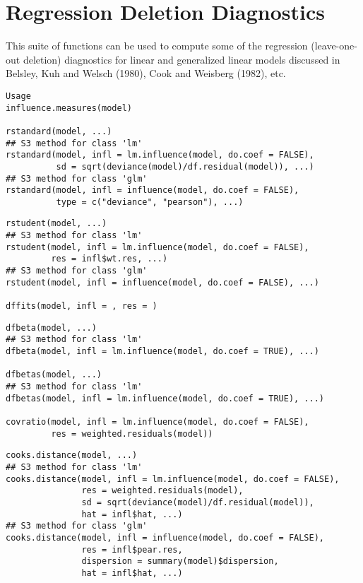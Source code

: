 \documentclass[residuals.tex]{subfiles}
\begin{document}
	
\section{Regression Deletion Diagnostics}

This suite of functions can be used to compute some of the regression (leave-one-out deletion) diagnostics for linear and generalized linear models discussed in Belsley, Kuh and Welsch (1980), Cook and Weisberg (1982), etc. 

\begin{framed}
\begin{verbatim}
Usage
influence.measures(model)

rstandard(model, ...)
## S3 method for class 'lm'
rstandard(model, infl = lm.influence(model, do.coef = FALSE),
          sd = sqrt(deviance(model)/df.residual(model)), ...)
## S3 method for class 'glm'
rstandard(model, infl = influence(model, do.coef = FALSE),
          type = c("deviance", "pearson"), ...)
\end{verbatim}
\end{framed}

\begin{framed}
	\begin{verbatim}
rstudent(model, ...)
## S3 method for class 'lm'
rstudent(model, infl = lm.influence(model, do.coef = FALSE),
         res = infl$wt.res, ...)
## S3 method for class 'glm'
rstudent(model, infl = influence(model, do.coef = FALSE), ...)

dffits(model, infl = , res = )
\end{verbatim}
\end{framed}

\begin{framed}
\begin{verbatim}
dfbeta(model, ...)
## S3 method for class 'lm'
dfbeta(model, infl = lm.influence(model, do.coef = TRUE), ...)

dfbetas(model, ...)
## S3 method for class 'lm'
dfbetas(model, infl = lm.influence(model, do.coef = TRUE), ...)

covratio(model, infl = lm.influence(model, do.coef = FALSE),
         res = weighted.residuals(model))
\end{verbatim}
\end{framed}

\begin{framed}
	\begin{verbatim}
cooks.distance(model, ...)
## S3 method for class 'lm'
cooks.distance(model, infl = lm.influence(model, do.coef = FALSE),
               res = weighted.residuals(model),
               sd = sqrt(deviance(model)/df.residual(model)),
               hat = infl$hat, ...)
## S3 method for class 'glm'
cooks.distance(model, infl = influence(model, do.coef = FALSE),
               res = infl$pear.res,
               dispersion = summary(model)$dispersion,
               hat = infl$hat, ...)
\end{verbatim}
\end{framed}
\end{document}
